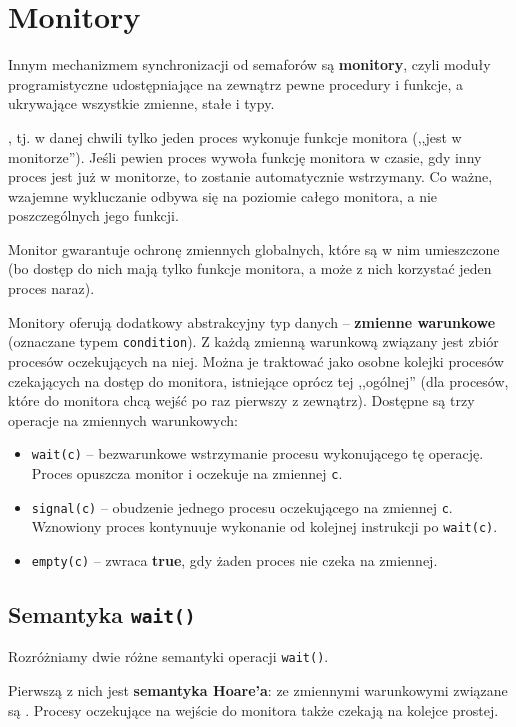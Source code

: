\section{Monitory}

Innym mechanizmem synchronizacji od semaforów są \textbf{monitory}, czyli moduły programistyczne udostępniające na zewnątrz pewne procedury i funkcje, a ukrywające wszystkie zmienne, stałe i typy.

, tj. w danej chwili tylko jeden proces wykonuje funkcje monitora (,,jest w monitorze''). Jeśli pewien proces wywoła funkcję monitora w czasie, gdy inny proces jest już w monitorze, to zostanie automatycznie wstrzymany. Co ważne, wzajemne wykluczanie odbywa się na poziomie całego monitora, a nie poszczególnych jego funkcji.

Monitor gwarantuje ochronę zmiennych globalnych, które są w nim umieszczone (bo dostęp do nich mają tylko funkcje monitora, a może z nich korzystać jeden proces naraz).

Monitory oferują dodatkowy abstrakcyjny typ danych -- \textbf{zmienne warunkowe} (oznaczane typem \texttt{condition}). Z każdą zmienną warunkową związany jest zbiór procesów oczekujących na niej. Można je traktować jako osobne kolejki procesów czekających na dostęp do monitora, istniejące oprócz tej ,,ogólnej'' (dla procesów, które do monitora chcą wejść po raz pierwszy z zewnątrz). Dostępne są trzy operacje na zmiennych warunkowych:
\begin{itemize}
    \item \texttt{wait(c)} -- bezwarunkowe wstrzymanie procesu wykonującego tę operację. Proces opuszcza monitor i oczekuje na zmiennej \texttt{c}.
    \item \texttt{signal(c)} -- obudzenie jednego procesu oczekującego na zmiennej \texttt{c}. Wznowiony proces kontynuuje wykonanie od kolejnej instrukcji po \texttt{wait(c)}.
    \item \texttt{empty(c)} -- zwraca \textbf{true}, gdy żaden proces nie czeka na zmiennej.
\end{itemize}

\subsection{Semantyka \texttt{wait()}}

Rozróżniamy dwie różne semantyki operacji \texttt{wait()}.

Pierwszą z nich jest \textbf{semantyka Hoare'a}: ze zmiennymi warunkowymi związane są . Procesy oczekujące na wejście do monitora także czekają na kolejce prostej.

